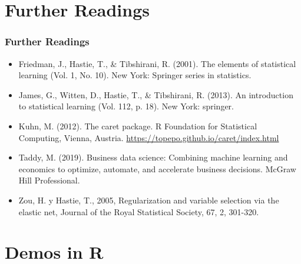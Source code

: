 \documentclass[
  shownotes,
  xcolor={svgnames},
  hyperref={colorlinks,citecolor=DarkBlue,linkcolor=DarkRed,urlcolor=DarkBlue}
  , aspectratio=169]{beamer}
\begin{document}
\section{Further Readings}
\begin{frame}
\frametitle{Further Readings}

\begin{itemize}


  \item Friedman, J., Hastie, T., \& Tibshirani, R. (2001). The elements of statistical learning (Vol. 1, No. 10). New York: Springer series in statistics.
  \medskip
  \item James, G., Witten, D., Hastie, T., \& Tibshirani, R. (2013). An introduction to statistical learning (Vol. 112, p. 18). New York: springer.
  \medskip
  \item Kuhn, M. (2012). The caret package. R Foundation for Statistical Computing, Vienna, Austria. \url{https://topepo.github.io/caret/index.html}
  \medskip
  \item Taddy, M. (2019). Business data science: Combining machine learning and economics to optimize, automate, and accelerate business decisions. McGraw Hill Professional.
  \medskip
  \item  Zou, H. y Hastie, T., 2005, Regularization and variable selection via the elastic net, Journal of the Royal Statistical Society, 67, 2, 301-320.
  
\end{itemize}

\end{frame}

\section{Demos in R}
\end{document}
